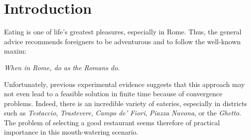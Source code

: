 \documentclass[twocolumn,10pt]{article}
\begin{document}
\begin{abstract}
\noindent In this paper, we describe the result of our experiments on
Algorithms for the Food-Selection Problem, which is the fundamental
problem first stated and addressed in the seminal paper~\cite{pigout}.
Because the key aspect of any experimental evaluation is the
\textbf{reproducibility}, we detail deeply the setup of all our
experiments, thus leaving to the interested eater the opportunity to
reproduce all the results described in this paper. More specifically, we
describe all the answers we provided to the
questions proposed in~\cite{pigout}:

\vspace{-2.4mm}

\begin{itemize}

\item Where can I have dinner tonight?

\vspace{-2.4mm}

\item What is the typical Roman cuisine that I should (not) miss?

\vspace{-2.4mm}

\item Where can I find the best coffee or gelato in town? 

\end{itemize}
\vspace{-1mm}



\bigskip


\end{abstract}

\vspace{-3mm}

\section{Introduction}
\label{se:intro}

\vspace{-2mm}
Eating is one of life's greatest pleasures, especially in Rome. Thus, 
the general advice recommends foreigners to be adventurous and to 
follow the well-known maxim:
\begin{center}
{\em When in Rome, do as the Romans do.}
\end{center}
Unfortunately, previous experimental evidence suggests that this 
approach may not even lead to a feasible solution in finite time because
of convergence problems.
Indeed, there is an incredible variety of eateries, especially in 
districts such as {\em Testaccio}, {\em Trastevere}, {\em Campo de' 
Fiori}, {\em Piazza Navona}, or the {\em Ghetto}. The problem of 
selecting a good restaurant seems therefore of practical importance 
in this mouth-watering scenario.
\end{document}
